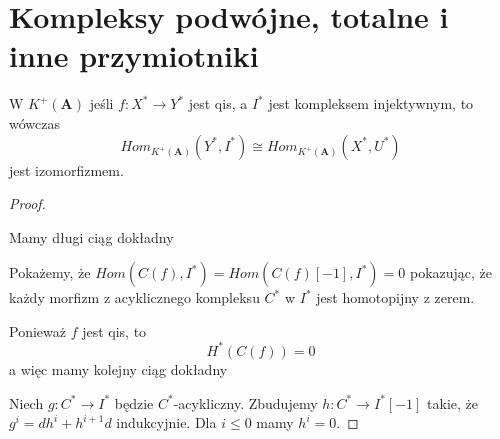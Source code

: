 \section{Kompleksy podwójne, totalne i inne przymiotniki}

\begin{lemma}
  W $K^+(\mathbf{A})$ jeśli $f:X^*\to Y^*$ jest qis, a $I^*$ jest kompleksem injektywnym, to wówczas
  $$Hom_{K^+(\mathbf{A})}(Y^*, I^*)\cong Hom_{K^+(\mathbf{A})}(X^*, U^*)$$
  jest izomorfizmem.
\end{lemma}

\begin{proof}
  \begin{center}\end{center}
  Mamy długi ciąg dokładny
  \begin{center}\end{center}
  Pokażemy, że $Hom(C(f), I^*)=Hom(C(f)[-1],I^*)=0$ pokazując, że każdy morfizm z acyklicznego kompleksu $C^*$ w $I^*$ jest homotopijny z zerem.

  Ponieważ $f$ jest qis, to 
  $$H^*(C(f))=0$$
  a więc mamy kolejny ciąg dokładny
  \begin{center}\end{center}

  Niech $g:C^*\to I^*$ będzie $C^*$-acykliczny. Zbudujemy $h:C^*\to I^*[-1]$ takie, że $g^i=dh^i+h^{i+1}d$ indukcyjnie. Dla $i\leq 0$ mamy $h^i=0$. 


\end{proof}
